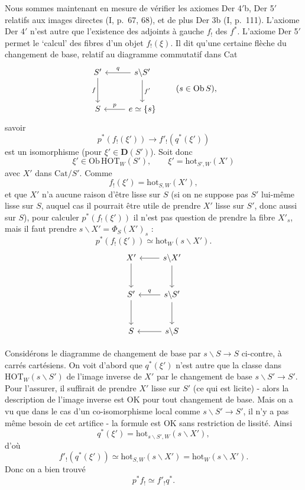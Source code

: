 \documentclass[11pt]{article}
\newcommand{\printedpage}[1]{\marginpar{\footnotesize p.~#1}}
\newcommand{\msp}[1]{\marginpar{\footnotesize [#1]}}
\newcommand{\HOT}{\mathrm{HOT}}
\newcommand{\hot}{\mathrm{hot}}
\newcommand{\Cat}{\mathrm{Cat}}
\begin{document}
Nous sommes maintenant en mesure de vérifier les axiomes Der 4$'$b, Der 5$'$ relatifs aux images directes (I, p.~67, 68), et de plus Der 3b (I, p.~111). L'axiome Der 4$'$ n'est autre que l'existence des adjoints à gauche $f_!$ des $f^*$. L'axiome Der 5$'$ permet le ‘calcul’ des fibres d'un objet $f_!(\xi)$. Il dit qu'une certaine
\printedpage{96}
\msp{157}
flèche du changement de base, relatif au diagramme commutatif dans Cat
\[\begin{tikzcd}[row sep=large]
S' \arrow[d,"f"'] & s\backslash S' \arrow[l,"q"'] \arrow[d,"f'"] \\
S & e\simeq\{s\} \arrow[l,"p"']
\end{tikzcd}\qquad(s\in\mathrm{Ob}\,S),\]
savoir
\[p^*(f_!(\xi'))\longrightarrow f'_!(q^*(\xi'))\]
est un isomorphisme (pour $\xi'\in\mathbf{D}(S')$). Soit donc
\[\xi'\in\mathrm{Ob}\,\HOT_W(S'),\qquad\xi'=\hot_{S',W}(X')\]
avec $X'$ dans $\Cat/S'$. Comme
\[f_!(\xi')=\hot_{S,W}(X'),\]
et que $X'$ n'a aucune raison d'être lisse sur $S$ (si on ne suppose pas $S'$ lui-même lisse sur $S$, auquel cas il pourrait être utile de prendre $X'$ lisse sur $S'$, donc aussi sur $S$), pour calculer $p^*(f_!(\xi'))$ il n'est pas question de prendre la fibre $X'_s$, mais il faut prendre $s\backslash X'=\Phi_S(X')_s$ :
\[p^*(f_!(\xi'))\simeq\hot_W(s\backslash X').\]
\[\begin{tikzcd}[row sep=large]
X' \arrow[d] & s\backslash X' \arrow[l] \arrow[d] \\
S' \arrow[d] & s\backslash S' \arrow[l,"q"'] \arrow[d] \\
S & s\backslash S \arrow[l]
\end{tikzcd}\]

Considérons le diagramme de changement de base par $s\backslash S\longrightarrow S$ ci-contre, à carrés cartésiens. On voit d'abord que $q^*(\xi')$ n'est autre que la classe dans $\HOT_W(s\backslash S')$ de l'image inverse de $X'$ par le changement de base $s\backslash S'\longrightarrow S'$. Pour l'assurer, il suffirait de prendre $X'$ lisse sur $S'$ (ce qui
\msp{158}
est licite) - alors la description de l'image inverse est OK pour tout changement de base. Mais on a vu que dans le cas d'un co-isomorphisme local comme $s\backslash S'\longrightarrow S'$, il n'y a pas même besoin de cet artifice - la formule est OK sans restriction de lissité. Ainsi
\[q^*(\xi')=\hot_{s\backslash S',W}(s\backslash X'),\]
\printedpage{97}
d'où
\[f'_!(q^*(\xi'))\simeq\hot_{S,W}(s\backslash X')=\hot_W(s\backslash X').\]
Donc on a bien trouvé
\[p^*f_!\simeq f'_!q^*.\]
\end{document}
